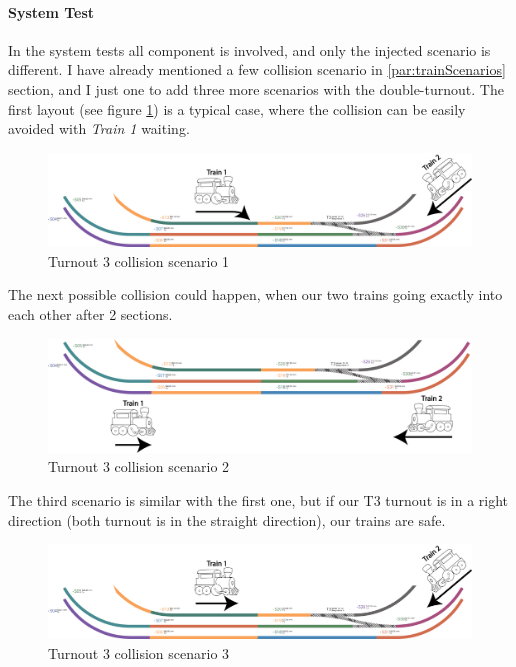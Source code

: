 \paragraph{System Test}
In the system tests all component is involved, and only the injected scenario is different. 
I have already mentioned a few collision scenario in \ref{par:trainScenarios} section, and I just one to add three more scenarios with the double-turnout. The first layout (see figure \ref{fig:LayoutT3-scenario1}) is a typical case, where the collision can be easily avoided with \textit{Train 1} waiting.
\begin{figure}[!h]
	\centering
	\includegraphics[width=150mm, keepaspectratio]{figures/modes3/layoutT3-scenario1.png}
	\caption{Turnout 3 collision scenario 1}
	\label{fig:LayoutT3-scenario1}
\end{figure}
The next possible collision could happen, when our two trains going exactly into each other after 2 sections.
\begin{figure}[!h]
	\centering
	\includegraphics[width=150mm, keepaspectratio]{figures/modes3/layoutT3-scenario2.png}
	\caption{Turnout 3 collision scenario 2}
	\label{fig:LayoutT3-scenario2}
\end{figure}
The third scenario is similar with the first one, but if our T3 turnout is in a right direction (both turnout is in the straight direction), our trains are safe.
\begin{figure}[!h]
	\centering
	\includegraphics[width=150mm, keepaspectratio]{figures/modes3/layoutT3-scenario3.png}
	\caption{Turnout 3 collision scenario 3}
	\label{fig:LayoutT3-scenario3}
\end{figure}